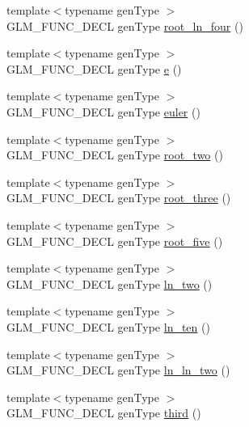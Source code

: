 \begin{DoxyCompactItemize}
{\footnotesize template$<$typename gen\+Type $>$ }\\G\+L\+M\+\_\+\+F\+U\+N\+C\+\_\+\+D\+E\+CL gen\+Type \hyperlink{group__gtc__constants_ga9cae3fad9314e34c1d3aab71fcdef05f}{root\+\_\+ln\+\_\+four} ()
\item 
{\footnotesize template$<$typename gen\+Type $>$ }\\G\+L\+M\+\_\+\+F\+U\+N\+C\+\_\+\+D\+E\+CL gen\+Type \hyperlink{group__gtc__constants_gab83fb6de0f05d6c0d11bdf0479f8319e}{e} ()
\item 
{\footnotesize template$<$typename gen\+Type $>$ }\\G\+L\+M\+\_\+\+F\+U\+N\+C\+\_\+\+D\+E\+CL gen\+Type \hyperlink{group__gtc__constants_ga6f14b46653b7ead1edcbd0fc6c9c5289}{euler} ()
\item 
{\footnotesize template$<$typename gen\+Type $>$ }\\G\+L\+M\+\_\+\+F\+U\+N\+C\+\_\+\+D\+E\+CL gen\+Type \hyperlink{group__gtc__constants_gab91b7799f88f9f2be33e385dec11b9c2}{root\+\_\+two} ()
\item 
{\footnotesize template$<$typename gen\+Type $>$ }\\G\+L\+M\+\_\+\+F\+U\+N\+C\+\_\+\+D\+E\+CL gen\+Type \hyperlink{group__gtc__constants_gab3183635ac615473e2f95852f491be83}{root\+\_\+three} ()
\item 
{\footnotesize template$<$typename gen\+Type $>$ }\\G\+L\+M\+\_\+\+F\+U\+N\+C\+\_\+\+D\+E\+CL gen\+Type \hyperlink{group__gtc__constants_gace2b8dfed1ab9fabbb67dde08e7e5b58}{root\+\_\+five} ()
\item 
{\footnotesize template$<$typename gen\+Type $>$ }\\G\+L\+M\+\_\+\+F\+U\+N\+C\+\_\+\+D\+E\+CL gen\+Type \hyperlink{group__gtc__constants_ga22fae798430edc3022766af4fd83e8a4}{ln\+\_\+two} ()
\item 
{\footnotesize template$<$typename gen\+Type $>$ }\\G\+L\+M\+\_\+\+F\+U\+N\+C\+\_\+\+D\+E\+CL gen\+Type \hyperlink{group__gtc__constants_ga48addf0cb0980277d208a71a1c59c073}{ln\+\_\+ten} ()
\item 
{\footnotesize template$<$typename gen\+Type $>$ }\\G\+L\+M\+\_\+\+F\+U\+N\+C\+\_\+\+D\+E\+CL gen\+Type \hyperlink{group__gtc__constants_ga650774609debe4a90bcac449b574de2c}{ln\+\_\+ln\+\_\+two} ()
\item 
{\footnotesize template$<$typename gen\+Type $>$ }\\G\+L\+M\+\_\+\+F\+U\+N\+C\+\_\+\+D\+E\+CL gen\+Type \hyperlink{group__gtc__constants_gabf280496105e0ad070287417f840ebd8}{third} ()

\end{DoxyCompactItemize}
